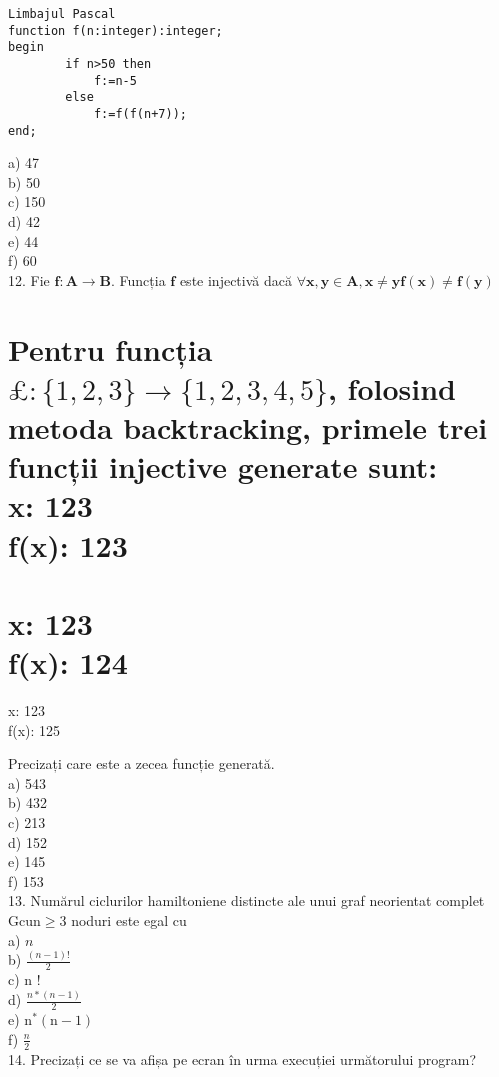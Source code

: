 \begin{verbatim}
Limbajul Pascal
function f(n:integer):integer;
begin
        if n>50 then
            f:=n-5
        else
            f:=f(f(n+7));
end;
\end{verbatim}

a) 47\\
b) 50\\
c) 150\\
d) 42\\
e) 44\\
f) 60\\
12. Fie $\mathbf{f}: \mathbf{A} \rightarrow \mathbf{B}$. Funcția $\mathbf{f}$ este injectivă dacă $\forall \mathbf{x}, \mathbf{y} \in \mathbf{A}, \mathbf{x} \neq \mathbf{y} \mathbf{f}(\mathbf{x}) \neq \boldsymbol{f}(\mathbf{y})$

\section*{Pentru funcția $\pounds:\{1,2,3\} \rightarrow\{1,2,3,4,5\}$, folosind metoda backtracking, primele trei funcții injective generate sunt:\\
x: 123\\
f(x): 123}
\section*{x: 123\\
f(x): 124}
x: 123\\
f(x): 125

Precizați care este a zecea funcție generată.\\
a) 543\\
b) 432\\
c) 213\\
d) 152\\
e) 145\\
f) 153\\
13. Numărul ciclurilor hamiltoniene distincte ale unui graf neorientat complet $\mathrm{G} \mathrm{cu} \mathrm{n} \geq 3$ noduri este egal cu\\
a) $n$\\
b) $\frac{(n-1)!}{2}$\\
c) n !\\
d) $\frac{n *(n-1)}{2}$\\
e) $\mathrm{n}^{*}(\mathrm{n}-1)$\\
f) $\frac{n}{2}$\\
14. Precizați ce se va afișa pe ecran în urma execuției următorului program?

